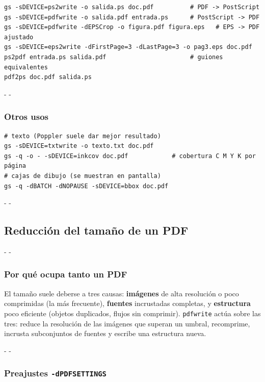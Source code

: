 \documentclass[11pt,a4paper]{article}
\makeatletter
\newcommand{\necesitaespacio}[1]{\par\penalty-100\begingroup
	\setlength{\dimen@}{#1}\dimen@ii\pagegoal\advance\dimen@ii-\pagetotal
	\ifdim\dimen@>\dimen@ii\ifdim\dimen@ii>\z@\vfil\fi\penalty-\@M\fi\endgroup}
\makeatother
\begin{document}
	\begin{lstlisting}
gs -sDEVICE=ps2write -o salida.ps doc.pdf          # PDF -> PostScript
gs -sDEVICE=pdfwrite -o salida.pdf entrada.ps      # PostScript -> PDF
gs -sDEVICE=pdfwrite -dEPSCrop -o figura.pdf figura.eps   # EPS -> PDF ajustado
gs -sDEVICE=eps2write -dFirstPage=3 -dLastPage=3 -o pag3.eps doc.pdf
ps2pdf entrada.ps salida.pdf                       # guiones equivalentes
pdf2ps doc.pdf salida.ps
\end{lstlisting}
	
	\necesitaespacio{6\baselineskip}
	\subsubsection{Otros usos}
	
	\begin{lstlisting}
# texto (Poppler suele dar mejor resultado)
gs -sDEVICE=txtwrite -o texto.txt doc.pdf
gs -q -o - -sDEVICE=inkcov doc.pdf            # cobertura C M Y K por página
# cajas de dibujo (se muestran en pantalla)
gs -q -dBATCH -dNOPAUSE -sDEVICE=bbox doc.pdf
\end{lstlisting}
	
	\necesitaespacio{13\baselineskip}
	\subsection{Reducción del tamaño de un PDF}\label{sec:gs-reduccion}
	
	\necesitaespacio{10\baselineskip}
	\subsubsection{Por qué ocupa tanto un PDF}
	
	El tamaño suele deberse a tres causas: \textbf{imágenes} de alta resolución o poco comprimidas (la más frecuente), \textbf{fuentes} incrustadas completas, y \textbf{estructura} poco eficiente (objetos duplicados, flujos sin comprimir). \texttt{pdfwrite} actúa sobre las tres: reduce la resolución de las imágenes que superan un umbral, recomprime, incrusta subconjuntos de fuentes y escribe una estructura nueva.
	
	\necesitaespacio{21\baselineskip}
	\subsubsection{Preajustes \texttt{-dPDFSETTINGS}}
	
\end{document}

